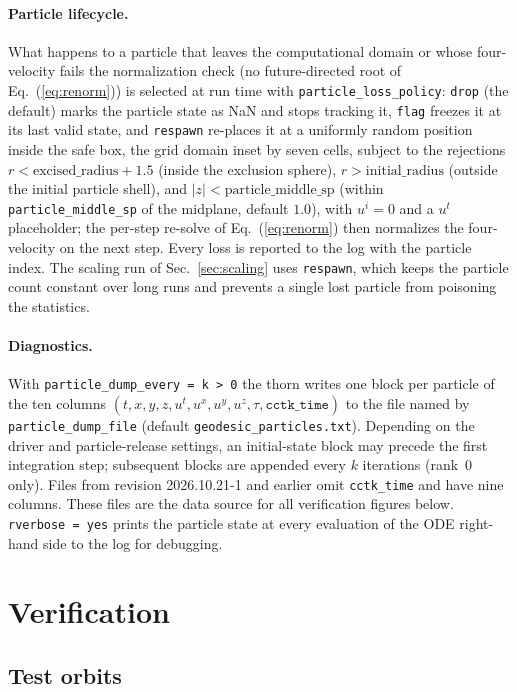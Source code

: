 \documentclass[11pt]{article}
\begin{document}
\paragraph{Particle lifecycle.}  What happens to a particle that leaves
the computational domain or whose four-velocity fails the normalization
check (no future-directed root of Eq.~(\ref{eq:renorm})) is selected at
run time with \texttt{particle\_loss\_policy}: \texttt{drop} (the
default) marks the particle state as NaN and stops tracking it,
\texttt{flag} freezes it at its last valid state, and \texttt{respawn}
re-places it at a uniformly random position inside the safe box, the grid
domain inset by seven cells, subject to the rejections
$r < \mathrm{excised\_radius}+1.5$ (inside the exclusion sphere),
$r > \mathrm{initial\_radius}$ (outside the initial particle shell), and
$|z| < \mathrm{particle\_middle\_sp}$ (within
\texttt{particle\_middle\_sp} of the midplane, default $1.0$), with
$u^i = 0$ and a $u^t$ placeholder; the per-step
re-solve of
Eq.~(\ref{eq:renorm}) then normalizes the four-velocity on the next step.
Every loss is reported to the log with the particle index.  The scaling
run of Sec.~\ref{sec:scaling} uses \texttt{respawn}, which keeps the
particle count constant over long runs and prevents a single lost
particle from poisoning the statistics.

\paragraph{Diagnostics.}  With \texttt{particle\_dump\_every = k > 0} the
thorn writes one block per particle of the ten columns
$(t,x,y,z,u^t,u^x,u^y,u^z,\tau,\texttt{cctk\_time})$ to the file named by
\texttt{particle\_dump\_file} (default \texttt{geodesic\_particles.txt}).
Depending on the driver and particle-release settings, an initial-state block
may precede the first integration step; subsequent blocks are appended every
$k$ iterations (rank~0 only).  Files from revision 2026.10.21-1 and earlier
omit \texttt{cctk\_time} and have nine columns.  These files are the data
source for all verification figures below.  \texttt{rverbose = yes} prints
the particle state at every evaluation of the ODE right-hand side to the log
for debugging.

\section{Verification}\label{sec:verification}

\subsection{Test orbits}
\end{document}

